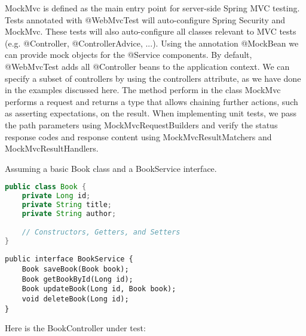MockMvc is defined as the main entry point for server-side Spring MVC testing.
Tests annotated with @WebMvcTest will auto-configure Spring Security and MockMvc.  These tests will also auto-configure all classes relevant to MVC tests (e.g. @Controller,  @ControllerAdvice, ...).  Using the annotation @MockBean we can provide mock objects for the @Service components.
By default, @WebMvcTest adds all @Controller beans to the application context. We can specify a subset of controllers by using the controllers attribute, as we have done in the examples discussed here. 
The method perform in the class MockMvc performs a request and returns a type that allows chaining further actions,  such as asserting expectations,  on the result.
When implementing unit tests, we pass the path parameters using MockMvcRequestBuilders and verify the status response codes and response content using MockMvcResultMatchers and MockMvcResultHandlers.

Assuming a basic Book class and a BookService interface.

\begin{lstlisting}[language=java, frame=single]
public class Book {
    private Long id;
    private String title;
    private String author;

    // Constructors, Getters, and Setters
}
\end{lstlisting}

\begin{lstlisting}
public interface BookService {
    Book saveBook(Book book);
    Book getBookById(Long id);
    Book updateBook(Long id, Book book);
    void deleteBook(Long id);
}
\end{lstlisting}

Here is the BookController under test:

